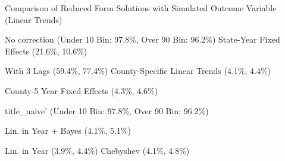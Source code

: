\caption{Comparison of Reduced Form Solutions with Simulated Outcome Variable (Linear Trends) \label{fig:distributions-existing-solutions}}
\caption*{\color{p1line}{\textbf{\textemdash\textemdash}} No correction (Under 10 Bin: 97.8\%, Over 90 Bin: 96.2\%) \hspace{1cm} \color{p2line}{- - -} State-Year Fixed Effects (21.6\%, 10.6\%)}
\caption*{\color{p3line}{\textbf{- - -}} With 3 Lags (59.4\%, 77.4\%) \hspace{1cm} \color{p4line}{\textbf{- - -}} County-Specific Linear Trends (4.1\%, 4.4\%)}
\caption*{\color{p5line}{\textbf{- - -}} County-5 Year Fixed Effects (4.3\%, 4.6\%)}


\caption*{\color{p1line}{\textbf{\textemdash\textemdash}} title_naive' (Under 10 Bin: 97.8\%, Over 90 Bin: 96.2\%)}
\caption*{\color{p2line}{\textbf{- - -}} Lin. in Year + Bayes (4.1\%, 5.1\%)}
\caption*{\color{p3line}{\textbf{- - -}} Lin. in Year (3.9\%, 4.4\%) \hspace{1cm} \color{p4line}{\textbf{- - -}} Chebyshev (4.1\%, 4.8\%)}
